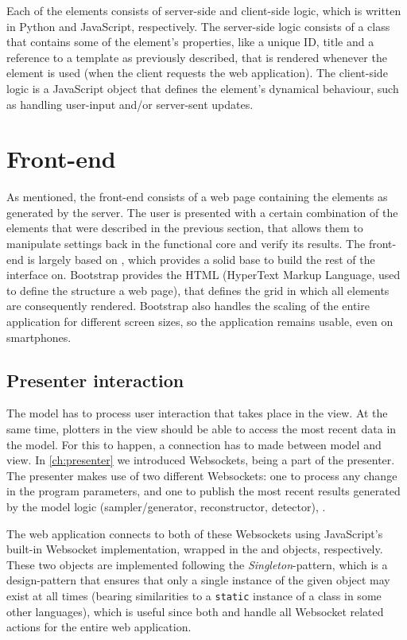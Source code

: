 \documentclass[a4paper, openany, oneside]{memoir}
\begin{document}
Each of the elements consists of server-side and client-side logic, which is written in Python and JavaScript, respectively. The server-side logic consists of a class that contains some of the element's properties, like a unique ID, title and a reference to a  template as previously described, that is rendered whenever the element is used (when the client requests the web application). The client-side logic is a JavaScript object that defines the element's dynamical behaviour, such as handling user-input and/or server-sent updates.

\section{Front-end}
\label{sec:clientside}
As mentioned, the front-end consists of a web page containing the elements as generated by the server. The user is presented with a certain combination of the elements that were described in the previous section, that allows them to manipulate settings back in the functional core and verify its results. The front-end is largely based on , which provides a solid base to build the rest of the interface on. Bootstrap provides the HTML (HyperText Markup Language, used to define the structure a web page), that defines the grid in which all elements are consequently rendered. Bootstrap also handles the scaling of the entire application for different screen sizes, so the application remains usable, even on smartphones.

\subsection{Presenter interaction}
\label{sub:presenter_interaction}
The model has to process user interaction that takes place in the view. At the same time, plotters in the view should be able to access the most recent data in the model. For this to happen, a connection has to made between model and view. In \cref{ch:presenter} we introduced Websockets, being a part of the presenter. The presenter makes use of two different Websockets: one to process any change in the program parameters,  and one to publish the most recent results generated by the model logic (sampler/generator, reconstructor, detector), .

The web application connects to both of these Websockets using JavaScript's built-in Websocket implementation, wrapped in the  and  objects, respectively. These two objects are implemented following the \emph{Singleton}-pattern, which is a design-pattern that ensures that only a single instance of the given object may exist at all times (bearing similarities to a \texttt{static} instance of a class in some other languages), which is useful since both  and  handle all Websocket related actions for the entire web application.
\end{document}
